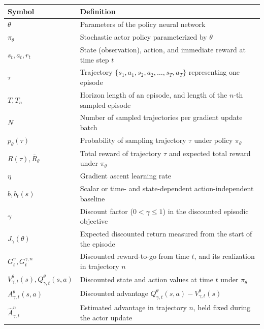 \documentclass[11pt, a4paper]{article}
\begin{document}
\begin{table}[h!]
\centering
\begin{tabular}{@{}ll@{}}
\toprule
\textbf{Symbol} & \textbf{Definition} \\
\midrule
$\theta$ & Parameters of the policy neural network \\
$\pi_\theta$ & Stochastic actor policy parameterized by $\theta$ \\
$s_t, a_t, r_t$ & State (observation), action, and immediate reward at time step $t$ \\
$\tau$ & Trajectory $\{s_1, a_1, s_2, a_2, \dots, s_T, a_T\}$ representing one episode \\
$T, T_n$ & Horizon length of an episode, and length of the $n$-th sampled episode \\
$N$ & Number of sampled trajectories per gradient update batch \\
$p_\theta(\tau)$ & Probability of sampling trajectory $\tau$ under policy $\pi_\theta$ \\
$R(\tau), \bar{R}_\theta$ & Total reward of trajectory $\tau$ and expected total reward under $\pi_\theta$ \\
$\eta$ & Gradient ascent learning rate \\
$b, b_t(s)$ & Scalar or time- and state-dependent action-independent baseline \\
$\gamma$ & Discount factor ($0 < \gamma \le 1$) in the discounted episodic objective \\
$J_\gamma(\theta)$ & Expected discounted return measured from the start of the episode \\
$G_t^\gamma, G_t^{\gamma,n}$ & Discounted reward-to-go from time $t$, and its realization in trajectory $n$ \\
$V_{\gamma,t}^\theta(s), Q_{\gamma,t}^\theta(s,a)$ & Discounted state and action values at time $t$ under $\pi_\theta$ \\
$A_{\gamma,t}^\theta(s,a)$ & Discounted advantage $Q_{\gamma,t}^\theta(s,a)-V_{\gamma,t}^\theta(s)$ \\
$\hat{A}_{\gamma,t}^n$ & Estimated advantage in trajectory $n$, held fixed during the actor update \\
\bottomrule
\end{tabular}
\end{table}
\end{document}
